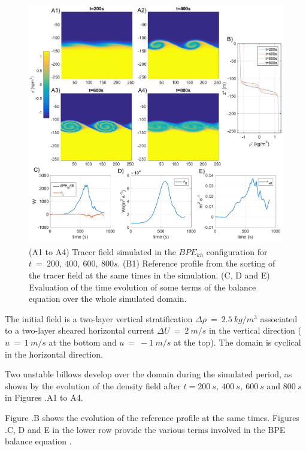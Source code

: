 \begin{figure}[h!]
\centering
\includegraphics[width=1\textwidth]{./CHAP_BPE/Fig_KH2.png}
\caption[Tracer field and evaluation of $\kappa_{eff}$ for configuration $BPE_{kh}$]{(A1 to A4) Tracer field simulated in the $BPE_{kh}$ configuration for $t\ = \ 200,\ 400,\ 600,\ 800s$. (B1) Reference profile from the sorting of the tracer field at the same times in the simulation. (C, D and E) Evaluation of the time evolution of some terms of the balance equation  over the whole simulated domain.}
\label{figCkh}
\end{figure}

The initial field is a two-layer vertical stratification  $\Delta \rho\  =\ 2.5\ kg/m^3$ associated to a two-layer sheared horizontal current $\Delta U\ =\ 2\ m/s$ in the vertical direction ($u\ =\ 1\ m/s$ at the bottom and $u\ =\ -1\ m/s$ at the top). The domain is cyclical in the horizontal direction. 

Two unstable billows develop over the domain during the simulated period, as shown by the evolution of the density field after $t = 200\ s,\ 400\ s,\ 600\ s$ and $800\ s$ in Figures .A1 to A4.

Figure .B shows the evolution of the reference profile at the same times. Figures .C, D and E in the lower row provide the various terms involved in the BPE balance equation .

